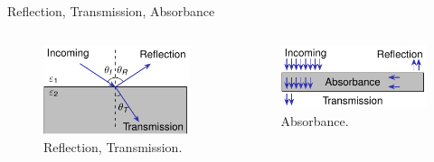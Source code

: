 \begin{frame}{Reflection, Transmission, Absorbance}
\begin{columns}
        \vspace{-8mm}
        \begin{figure}
            \centering
            \includegraphics[width=\textwidth]{Figures/Reflection_Transmission.pdf}
            \caption{Reflection, Transmission.}
            \label{fig:Reflection_Transmission}
        \end{figure}
        \vspace{-2mm}
        \begin{figure}
            \centering
            \includegraphics[width=\textwidth]{Figures/Absorbance.pdf}
            \caption{Absorbance.}
            \label{fig:Absorbance}
        \end{figure}
    \end{columns}
\end{frame}
